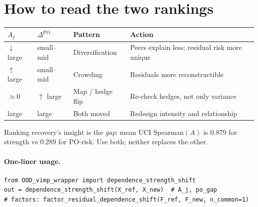 \documentclass[11pt]{article}
\begin{document}
\section{How to read the two rankings}

\begin{center}
\begin{tabular}{lllp{5.8cm}}
\toprule
$A_j$ & $\Delta^{\mathrm{PO}}$ & Pattern & Action \\
\midrule
$\downarrow$ large & small--mid & Diversification & Peers explain less; residual risk more unique \\
$\uparrow$ large & small--mid & Crowding & Residuals more reconstructible \\
$\approx 0$ & $\uparrow$ large & Map / hedge flip & Re-check hedges, not only variance \\
large & large & Both moved & Redesign intensity and relationship \\
\bottomrule
\end{tabular}
\end{center}

Ranking recovery's insight is the \emph{gap}: mean UCI Spearman$(A)$ is 
0.879 for strength vs 0.289 for PO-risk. 
Use both; neither replaces the other.

\paragraph{One-liner usage.}
\begin{verbatim}
from OOD_vimp_wrapper import dependence_strength_shift
out = dependence_strength_shift(X_ref, X_new)  # A_j, po_gap
# factors: factor_residual_dependence_shift(F_ref, F_new, n_common=1)
\end{verbatim}
\end{document}
